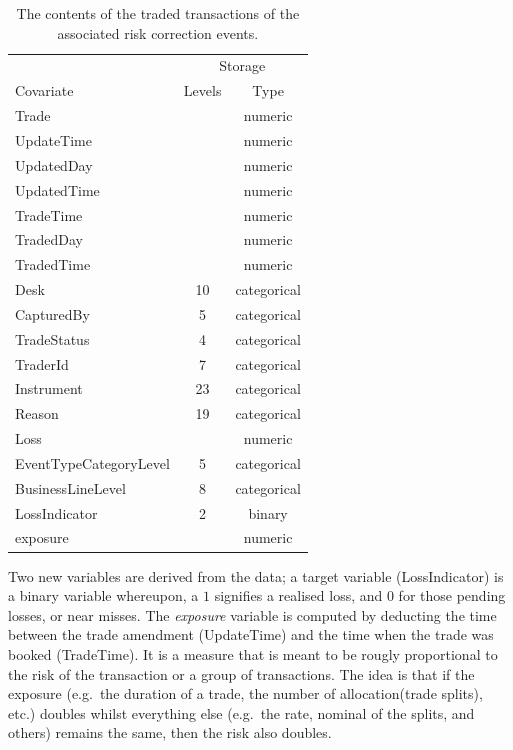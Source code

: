 \documentclass[]{article}
\begin{document}
\begin{table}[ht]
\centering
\caption{The contents of the traded transactions of the associated risk correction events.}
\begin{tabular}{lcc}
\toprule
  & \multicolumn{2}{c}{Storage} \\
Covariate     & Levels   & Type \\ 
\midrule
 Trade       &          & numeric \\
 UpdateTime  &          & numeric \\
 UpdatedDay  &          & numeric \\
 UpdatedTime &          & numeric \\
 TradeTime   &          & numeric \\
 TradedDay   &          & numeric \\
 TradedTime  &          & numeric \\
 Desk        &  10      & categorical \\
 CapturedBy  &  5       & categorical \\
 TradeStatus &  4       & categorical \\
 TraderId    &  7       & categorical \\
 Instrument  &  23      & categorical \\
 Reason      &  19      & categorical \\
 Loss        &          & numeric \\
 EventTypeCategoryLevel & 5  & categorical \\
 BusinessLineLevel      & 8  & categorical \\
 LossIndicator          & 2  & binary \\
 exposure               &    & numeric \\
 \bottomrule
\end{tabular}\label{tab_contents}
\end{table}

Two new variables are derived from the data; a target variable
(LossIndicator) is a binary variable whereupon, a \(1\) signifies a
realised loss, and \(0\) for those pending losses, or near misses. The
\emph{exposure} variable is computed by deducting the time between the
trade amendment (UpdateTime) and the time when the trade was booked
(TradeTime). It is a measure that is meant to be rougly proportional to
the risk of the transaction or a group of transactions. The idea is that
if the exposure (e.g.~the duration of a trade, the number of
allocation(trade splits), etc.) doubles whilst everything else (e.g.~the
rate, nominal of the splits, and others) remains the same, then the risk
also doubles.
\end{document}
